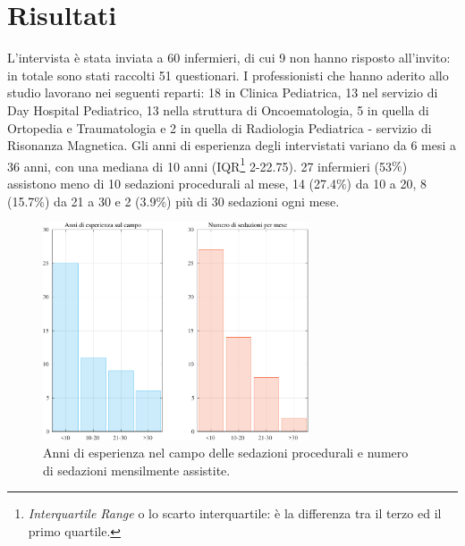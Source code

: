 \chapter{Risultati}

L'intervista è stata inviata a 60 infermieri, di cui 9 non hanno risposto all'invito: in totale sono stati raccolti 51 questionari. I professionisti che hanno aderito allo studio lavorano nei seguenti reparti: 18 in Clinica Pediatrica, 13 nel servizio di Day Hospital Pediatrico, 13 nella struttura di Oncoematologia, 5 in quella di Ortopedia e Traumatologia e 2 in quella di Radiologia Pediatrica - servizio di Risonanza Magnetica. Gli anni di esperienza degli intervistati variano da 6 mesi a 36 anni, con una mediana di 10 anni (IQR\footnote{\emph{Interquartile Range} o lo scarto interquartile: è la differenza tra il terzo ed il primo quartile.} 2-22.75). 27 infermieri (53$\%$) assistono meno di 10 sedazioni procedurali al mese, 14 (27.4$\%$) da 10 a 20, 8 (15.7$\%$) da 21 a 30 e 2 (3.9$\%$) più di 30 sedazioni ogni mese. 

\begin{figure}[h]
    \centering
    \includegraphics[width=0.7\textwidth]{Figure/esperienzaVSfrequenza.pdf}
    \caption{Anni di esperienza nel campo delle sedazioni procedurali e numero di sedazioni mensilmente assistite.}
    \label{fig:esperienzavsfrequenza}
\end{figure}

